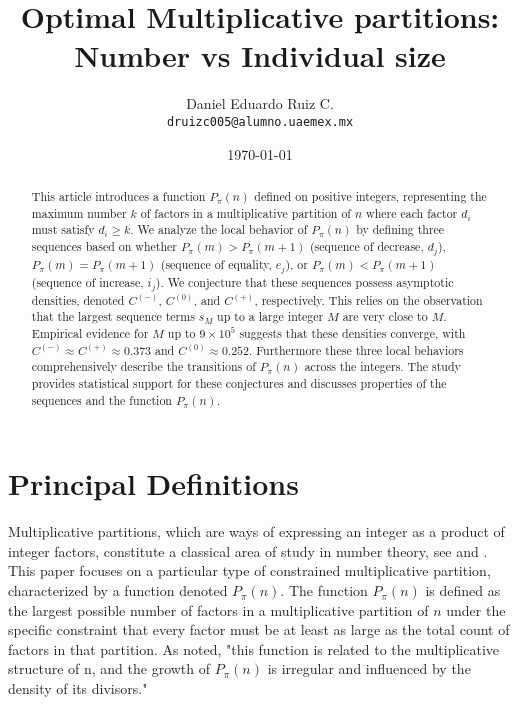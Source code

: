 \documentclass[]{article}
\title{Optimal Multiplicative partitions: Number vs Individual size}
\author{Daniel Eduardo Ruiz C. \\ \texttt{druizc005@alumno.uaemex.mx}}
\date{\today}
\theoremstyle{plain}%
\theoremstyle{definition}
\theoremstyle{remark}
\begin{document}
	
	\maketitle
	
	
	\begin{abstract}
		This article introduces a function $P_{\pi}(n)$ defined on positive integers, representing the maximum number $k$ of factors in a multiplicative partition of $n$ where each factor $d_i$ must satisfy $d_i \ge k$. We analyze the local behavior of $P_{\pi}(n)$ by defining three sequences based on whether $P_{\pi}(m) > P_{\pi}(m+1)$ (sequence of decrease, $d_j$), $P_{\pi}(m) = P_{\pi}(m+1)$ (sequence of equality, $e_j$), or $P_{\pi}(m) < P_{\pi}(m+1)$ (sequence of increase, $i_j$). We conjecture that these sequences possess asymptotic densities, denoted $C^{(-)}$, $C^{(0)}$, and $C^{(+)}$, respectively. This relies on the observation that the largest sequence terms $s_M$ up to a large integer $M$ are very close to $M$. Empirical evidence for $M$ up to $9 \times 10^5$ suggests that these densities converge, with $C^{(-)} \approx C^{(+)} \approx 0.373$ and $C^{(0)} \approx 0.252$. Furthermore these three local behaviors comprehensively describe the transitions of $P_{\pi}(n)$ across the integers. The study provides statistical support for these conjectures and discusses properties of the sequences and the function $P_{\pi}(n)$.
		
	\end{abstract}
	
	\tableofcontents
	
	\section{Principal Definitions}
	
	Multiplicative partitions, which are ways of expressing an integer as a product of integer factors, constitute a classical area of study in number theory, see \cite{Zaharescu2010} and \cite{Chamberland2013}. This paper focuses on a particular type of constrained multiplicative partition, characterized by a function denoted $P_{\pi}(n)$. The function $P_{\pi}(n)$ is defined as the largest possible number of factors in a multiplicative partition of $n$ under the specific constraint that every factor must be at least as large as the total count of factors in that partition. As noted, "this function is related to the multiplicative structure of n, and the growth of $P_{\pi}(n)$ is irregular and influenced by the density of its divisors."
	
\end{document}
